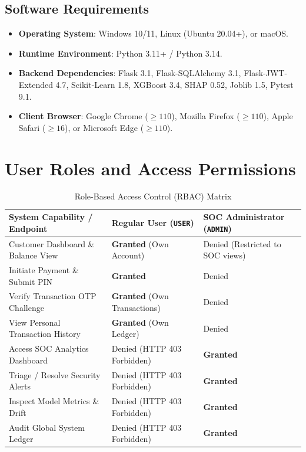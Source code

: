 \subsection{Software Requirements}
\begin{itemize}
    \item \textbf{Operating System}: Windows 10/11, Linux (Ubuntu 20.04+), or macOS.
    \item \textbf{Runtime Environment}: Python 3.11+ / Python 3.14.
    \item \textbf{Backend Dependencies}: Flask 3.1, Flask-SQLAlchemy 3.1, Flask-JWT-Extended 4.7, Scikit-Learn 1.8, XGBoost 3.4, SHAP 0.52, Joblib 1.5, Pytest 9.1.
    \item \textbf{Client Browser}: Google Chrome ($\ge 110$), Mozilla Firefox ($\ge 110$), Apple Safari ($\ge 16$), or Microsoft Edge ($\ge 110$).
\end{itemize}

\section{User Roles and Access Permissions}
\begin{table}[h]
\centering
\caption{Role-Based Access Control (RBAC) Matrix}
\label{tab:rbac_matrix}
\begin{tabularx}{\textwidth}{lXX}
\toprule
\textbf{System Capability / Endpoint} & \textbf{Regular User (\texttt{USER})} & \textbf{SOC Administrator (\texttt{ADMIN})} \\
\midrule
Customer Dashboard \& Balance View & \textbf{Granted} (Own Account) & Denied (Restricted to SOC views) \\
Initiate Payment \& Submit PIN & \textbf{Granted} & Denied \\
Verify Transaction OTP Challenge & \textbf{Granted} (Own Transactions) & Denied \\
View Personal Transaction History & \textbf{Granted} (Own Ledger) & Denied \\
Access SOC Analytics Dashboard & Denied (HTTP 403 Forbidden) & \textbf{Granted} \\
Triage / Resolve Security Alerts & Denied (HTTP 403 Forbidden) & \textbf{Granted} \\
Inspect Model Metrics \& Drift & Denied (HTTP 403 Forbidden) & \textbf{Granted} \\
Audit Global System Ledger & Denied (HTTP 403 Forbidden) & \textbf{Granted} \\
\bottomrule
\end{tabularx}
\end{table}
